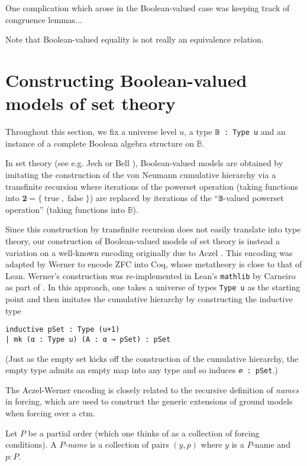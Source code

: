 \documentclass[a4paper,USenglish,cleveref, autoref]{lipics-v2019}
\newcommand{\B}{\mathbb{B}}
\begin{document}
One complication which arose in the Boolean-valued case was keeping track of congruence lemmas...

Note that Boolean-valued equality is not really an equivalence relation.
\section{Constructing Boolean-valued models of set theory}
\label{sect:bvm}
Throughout this section, we fix a universe level $u$, a type \lstinline{𝔹 : Type u} and an instance of a complete Boolean algebra structure on $\B$.

In set theory (see e.g. Jech \cite{jech1} or Bell \cite{bell1}), Boolean-valued models are obtained by imitating the construction of the von Neumann cumulative hierarchy via a transfinite recursion where iterations of the powerset operation (taking functions into $\mathbf{2} = \{\operatorname{true}, \operatorname{false}\}$) are replaced by iterations of the ``\lstinline{𝔹}-valued powerset operation'' (taking functions into $\B$).

Since this construction by transfinite recursion does not easily translate into type theory, our construction of Boolean-valued models of set theory is instead a variation on a well-known encoding originally due to Aczel \cite{aczel1} \cite{aczel2} \cite{aczel3}. This encoding was adapted by Werner \cite{werner1} to encode ZFC into Coq, whose metatheory is close to that of Lean. Werner's construction was re-implemented in Lean's \texttt{mathlib} by Carneiro as part of \cite{mario1}. In this approach, one takes a universe of types \texttt{Type u} as the starting point and then imitates the cumulative hierarchy by constructing the inductive type
\begin{lstlisting}
inductive pSet : Type (u+1)
| mk (α : Type u) (A : α → pSet) : pSet
\end{lstlisting}
(Just as the empty set kicks off the construction of the cumulative hierarchy, the empty type admits an empty map into any type and so induces \lstinline{∅ : pSet}.)

The Aczel-Werner encoding is closely related to the recursive definition of \emph{names} in forcing, which are used to construct the generic extensions of ground models when forcing over a ctm.

\begin{definition}\label{def-p-name}
Let $P$ be a partial order (which one thinks of as a collection of forcing conditions). A \emph{$P$-name} is a collection of pairs $(y, p)$ where $y$ is a $P$-name and $p : P$.
\end{definition}
\end{document}
